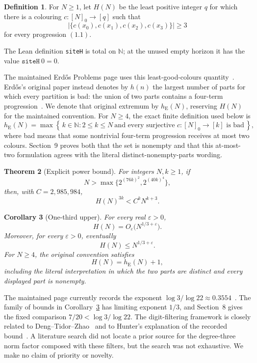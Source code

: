 \documentclass[11pt]{article}
\newtheorem{theorem}{Theorem}[section]
\newtheorem{corollary}[theorem]{Corollary}
\theoremstyle{definition}
\newtheorem{definition}[theorem]{Definition}
\newcommand{\N}{\mathbb N}
\newcommand{\siteH}{H}
\newcommand{\erdosH}{h_{\mathrm E}}
\newcommand{\leanname}[1]{\texttt{#1}}
\begin{document}
\begin{definition}
For \(N\geq1\), let \(\siteH(N)\) be the least positive integer \(q\) for
which there is a colouring \(c:[N]_0\to[q]\) such that
\[
 \bigl|\{c(x_0),c(x_1),c(x_2),c(x_3)\}\bigr|\geq3
 \tag{1.2}
\]
for every progression \((1.1)\).
\end{definition}

The Lean definition \leanname{siteH} is total on \(\N\); at the unused empty
horizon it has the value \(\leanname{siteH}\ 0=0\).

The maintained Erd\H{o}s Problems page uses this least-good-colours
quantity~\cite{erdosproblems160}.  Erd\H{o}s's original paper instead denotes
by \(h(n)\) the largest number of parts for which every partition is bad:
the union of two parts contains a four-term progression~\cite{erdos1989}.
We denote that original extremum by \(\erdosH(N)\), reserving \(\siteH(N)\)
for the maintained convention.
For \(N\geq4\), the exact finite definition used below is
\[
 \erdosH(N)=
 \max\left\{\,k\in\N:
 2\leq k\leq N\ \text{and every surjective }c:[N]_0\to[k]
 \text{ is bad}\,\right\},
\]
where bad means that some nontrivial four-term progression receives at
most two colours.  Section~9 proves both that the set is nonempty and that
this at-most-two formulation agrees with the literal distinct-nonempty-parts
wording.

\begin{theorem}[Explicit power bound]\label{thm:power}
For integers \(N,k\geq1\), if
\[
 N>\max\bigl\{2^{(76k)^2},2^{(40k)^4}\bigr\},
 \tag{1.3}
\]
then, with \(C=2{,}985{,}984\),
\[
 \siteH(N)^{3k}<C^kN^{k+3}.
 \tag{1.4}
\]
\end{theorem}

\begin{corollary}[One-third upper]\label{cor:epsilon}
For every real \(\varepsilon>0\),
\[
 \siteH(N)=O_\varepsilon\bigl(N^{1/3+\varepsilon}\bigr).
 \tag{1.5}
\]
Moreover, for every \(\varepsilon>0\), eventually
\[
 \siteH(N)\leq N^{1/3+\varepsilon}.
 \tag{1.6}
\]
For \(N\geq4\), the original convention satisfies
\[
 \siteH(N)=\erdosH(N)+1,
 \tag{1.7}
\]
including the literal interpretation in which the two parts are distinct and
every displayed part is nonempty.
\end{corollary}

The maintained page currently records the exponent
\(\log 3/\log 22\approx0.3554\)~\cite{erdosproblems160}.  The family of bounds
in Corollary~\ref{cor:epsilon} has limiting exponent \(1/3\), and Section~8
gives the fixed comparison \(7/20<\log3/\log22\).  The digit-filtering
framework is closely related to Deng--Tidor--Zhao~\cite{dtz} and to Hunter's
explanation of the recorded bound~\cite{huntercomment}.  A literature search
did not locate a prior source for the degree-three norm factor composed with
these filters, but the search was not exhaustive.  We make no claim of
priority or novelty.
\end{document}
